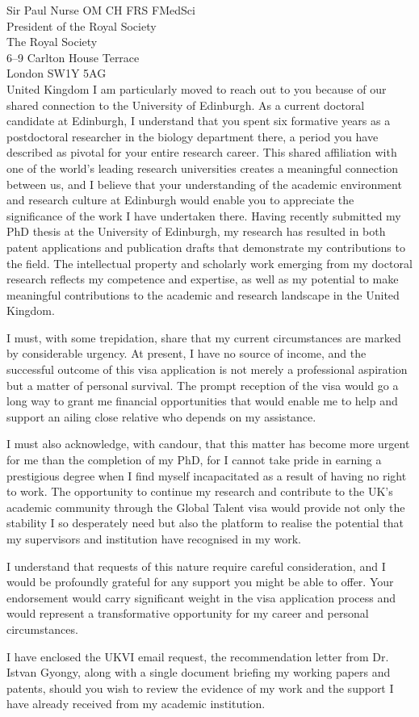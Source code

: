 \documentclass[12pt,a4paper]{letter}
\begin{document}
\begin{letter}{Sir Paul Nurse OM CH FRS FMedSci\\President of the Royal Society\\The Royal Society\\6--9 Carlton House Terrace\\London SW1Y 5AG\\United Kingdom}
I am particularly moved to reach out to you because of our shared connection to the University of Edinburgh. As a current doctoral candidate at Edinburgh, I understand that you spent six formative years as a postdoctoral researcher in the biology department there, a period you have described as pivotal for your entire research career. This shared affiliation with one of the world's leading research universities creates a meaningful connection between us, and I believe that your understanding of the academic environment and research culture at Edinburgh would enable you to appreciate the significance of the work I have undertaken there. Having recently submitted my PhD thesis at the University of Edinburgh, my research has resulted in both patent applications and publication drafts that demonstrate my contributions to the field. The intellectual property and scholarly work emerging from my doctoral research reflects my competence and expertise, as well as my potential to make meaningful contributions to the academic and research landscape in the United Kingdom.

I must, with some trepidation, share that my current circumstances are marked by considerable urgency. At present, I have no source of income, and the successful outcome of this visa application is not merely a professional aspiration but a matter of personal survival. The prompt reception of the visa would go a long way to grant me financial opportunities that would enable me to help and support an ailing close relative who depends on my assistance. 

I must also acknowledge, with candour, that this matter has become more urgent for me than the completion of my PhD, for I cannot take pride in earning a prestigious degree when I find myself incapacitated as a result of having no right to work. The opportunity to continue my research and contribute to the UK's academic community through the Global Talent visa would provide not only the stability I so desperately need but also the platform to realise the potential that my supervisors and institution have recognised in my work.

I understand that requests of this nature require careful consideration, and I would be profoundly grateful for any support you might be able to offer. Your endorsement would carry significant weight in the visa application process and would represent a transformative opportunity for my career and personal circumstances.

I have enclosed the UKVI email request, the recommendation letter from Dr. Istvan Gyongy, along with a single document briefing my working papers and patents, should you wish to review the evidence of my work and the support I have already received from my academic institution.


\end{letter}
\end{document}
